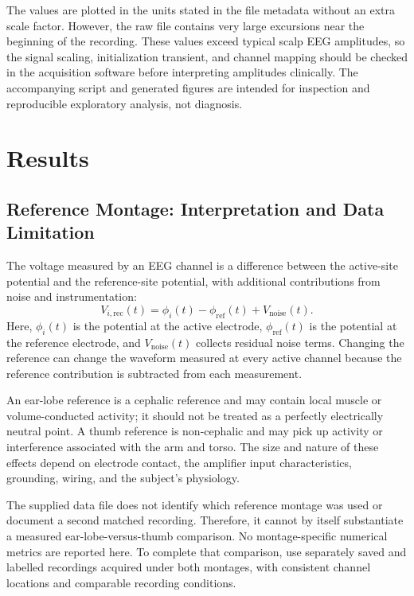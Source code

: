 \documentclass[12pt,a4paper]{article}
\begin{document}
The values are plotted in the units stated in the file metadata without an extra scale factor. However, the raw file contains very large excursions near the beginning of the recording. These values exceed typical scalp EEG amplitudes, so the signal scaling, initialization transient, and channel mapping should be checked in the acquisition software before interpreting amplitudes clinically. The accompanying script and generated figures are intended for inspection and reproducible exploratory analysis, not diagnosis.

\section{Results}

\subsection{Reference Montage: Interpretation and Data Limitation}
The voltage measured by an EEG channel is a difference between the active-site potential and the reference-site potential, with additional contributions from noise and instrumentation:
\begin{equation}
    V_{i,\mathrm{rec}}(t)=\phi_i(t)-\phi_{\mathrm{ref}}(t)+V_{\mathrm{noise}}(t).
    \label{eq:differential_eeg}
\end{equation}
Here, $\phi_i(t)$ is the potential at the active electrode, $\phi_{\mathrm{ref}}(t)$ is the potential at the reference electrode, and $V_{\mathrm{noise}}(t)$ collects residual noise terms. Changing the reference can change the waveform measured at every active channel because the reference contribution is subtracted from each measurement.

An ear-lobe reference is a cephalic reference and may contain local muscle or volume-conducted activity; it should not be treated as a perfectly electrically neutral point. A thumb reference is non-cephalic and may pick up activity or interference associated with the arm and torso. The size and nature of these effects depend on electrode contact, the amplifier input characteristics, grounding, wiring, and the subject's physiology.

The supplied data file does not identify which reference montage was used or document a second matched recording. Therefore, it cannot by itself substantiate a measured ear-lobe-versus-thumb comparison. No montage-specific numerical metrics are reported here. To complete that comparison, use separately saved and labelled recordings acquired under both montages, with consistent channel locations and comparable recording conditions.
\end{document}
